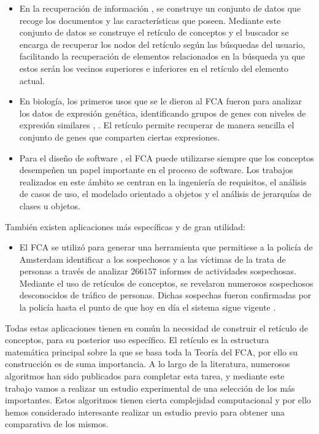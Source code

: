 \documentclass[oneside,openright,titlepage,numbers=noenddot,openany,headinclude,footinclude=true,
cleardoublepage=empty,abstractoff,BCOR=5mm,paper=a4,fontsize=12pt,main=spanish]{scrreprt}
\begin{document}
\begin{itemize}
    \item En la recuperación de información \cite{inforetrieval}, se construye un conjunto de datos que recoge los documentos y las características que poseen. Mediante este conjunto de datos se construye el retículo de conceptos y el buscador se encarga de recuperar los nodos del retículo según las búsquedas del usuario, facilitando la recuperación de elementos relacionados en la búsqueda ya que estos serán los vecinos superiores e inferiores en el retículo del elemento actual.
    
    \item En biología, los primeros usos que se le dieron al FCA fueron para analizar los datos de expresión genética, identificando grupos de genes con niveles de expresión similares \cite{biologia1}, \cite{biologia2}. El retículo permite recuperar de manera sencilla el conjunto de genes que comparten ciertas expresiones.
    
    \item Para el diseño de software \cite{softwa}, el FCA puede utilizarse siempre que los conceptos desempeñen un papel importante en el proceso de software. Los trabajos realizados en este ámbito se centran en la ingeniería de requisitos, el análisis de casos de uso, el modelado orientado a objetos y  el análisis de jerarquías de clases u objetos.
\end{itemize}

También existen aplicaciones más específicas y de gran utilidad:

\begin{itemize}
    \item El FCA se utilizó para generar una herramienta que permitiese a la policía de Amsterdam identificar a los sospechosos y a las víctimas de la trata de personas a través de analizar $266157$ informes de actividades sospechosas. Mediante el uso de retículos de conceptos, se revelaron numerosos sospechosos desconocidos de tráfico de personas. Dichas sospechas fueron confirmadas por la policía hasta el punto de que hoy en día el sistema sigue vigente \cite{sospecius}.
\end{itemize}

Todas estas aplicaciones tienen en común la necesidad de construir el retículo de conceptos, para su posterior uso específico. El retículo es la estructura matemática principal sobre la que se basa toda la Teoría del FCA, por ello su construcción es de suma importancia. A lo largo de la literatura, numerosos algoritmos han sido publicados para completar esta tarea, y mediante este trabajo vamos a realizar un estudio experimental de una selección de los más importantes. Estos algoritmos tienen cierta complejidad computacional y por ello hemos considerado interesante realizar un estudio previo para obtener una comparativa de los mismos.
\end{document}
